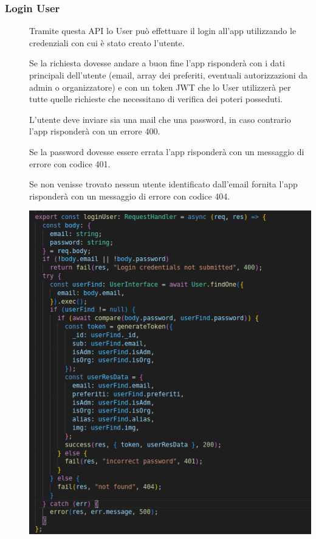 \documentclass{article}
\begin{document}
\subsubsection{Login User}
\begin{description}
    \item[] Tramite questa API lo User può effettuare il login all'app utilizzando le credenziali con cui è stato creato l'utente.
    \item[] Se la richiesta dovesse andare a buon fine l'app risponderà con i dati principali dell'utente (email, array dei preferiti, eventuali autorizzazioni da admin o organizzatore) e con un token JWT che lo User utilizzerà per tutte quelle richieste che necessitano di verifica dei poteri posseduti.
    \item[] L'utente deve inviare sia una mail che una password, in caso contrario l'app risponderà con un errore 400.
    \item[] Se la password dovesse essere errata l'app risponderà con un messaggio di errore con codice 401.
    \item[] Se non venisse trovato nessun utente identificato dall'email fornita l'app risponderà con un messaggio di errore con codice 404.
    \item[] \begin{center}
            \includegraphics[scale=0.5]{loginUser.png}
        \end{center}
\end{description}
\clearpage
\end{document}
